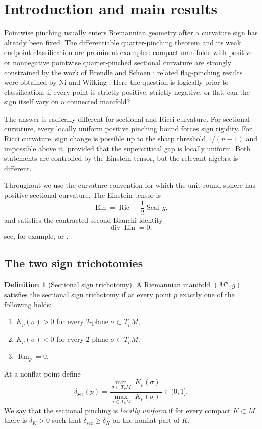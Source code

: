 \documentclass[11pt,reqno]{amsart}
\theoremstyle{definition}
\newtheorem{definition}[theorem]{Definition}
\theoremstyle{remark}
\newcommand{\Ric}{\operatorname{Ric}}
\newcommand{\Rm}{\operatorname{Rm}}
\newcommand{\Scal}{\operatorname{Scal}}
\newcommand{\Ein}{\operatorname{Ein}}
\newcommand{\diver}{\operatorname{div}}
\newcommand{\dsec}{\delta_{\mathrm{sec}}}
\newcommand{\abs}[1]{\lvert #1\rvert}
\begin{document}
\section{Introduction and main results}

Pointwise pinching usually enters Riemannian geometry after a curvature sign has already been fixed.  The differentiable quarter-pinching theorem and its weak endpoint classification are prominent examples: compact manifolds with positive or nonnegative pointwise quarter-pinched sectional curvature are strongly constrained by the work of Brendle and Schoen \cite{BrendleSchoenActa,BrendleSchoenJAMS}; related flag-pinching results were obtained by Ni and Wilking \cite{NiWilking}.  Here the question is logically prior to classification: if every point is strictly positive, strictly negative, or flat, can the sign itself vary on a connected manifold?

The answer is radically different for sectional and Ricci curvature.  For sectional curvature, every locally uniform positive pinching bound forces sign rigidity.  For Ricci curvature, sign change is possible up to the sharp threshold $1/(n-1)$ and impossible above it, provided that the supercritical gap is locally uniform.  Both statements are controlled by the Einstein tensor, but the relevant algebra is different.

Throughout we use the curvature convention for which the unit round sphere has positive sectional curvature.  The Einstein tensor is
\begin{equation}\label{eq:Ein-def}
\Ein=\Ric-\frac12\Scal\,g,
\end{equation}
and satisfies the contracted second Bianchi identity
\begin{equation}\label{eq:Bianchi}
\diver\Ein=0;
\end{equation}
see, for example, \cite[Chapters 7 and 8]{Lee} or \cite[Chapter 1]{Besse}.

\subsection{The two sign trichotomies}

\begin{definition}[Sectional sign trichotomy]
A Riemannian manifold $(M^n,g)$ satisfies the sectional sign trichotomy if at every point $p$ exactly one of the following holds:
\begin{enumerate}[label=(\roman*)]
\item $K_p(\sigma)>0$ for every $2$-plane $\sigma\subset T_pM$;
\item $K_p(\sigma)<0$ for every $2$-plane $\sigma\subset T_pM$;
\item $\Rm_p=0$.
\end{enumerate}
At a nonflat point define
\[
\dsec(p)=\frac{\min_{\sigma\subset T_pM}\abs{K_p(\sigma)}}
{\max_{\sigma\subset T_pM}\abs{K_p(\sigma)}}\in(0,1].
\]
We say that the sectional pinching is \emph{locally uniform} if for every compact $K\subset M$ there is $\delta_K>0$ such that $\dsec\ge\delta_K$ on the nonflat part of $K$.
\end{definition}
\end{document}

